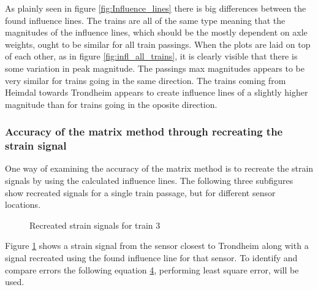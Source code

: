 As plainly seen in figure \ref{fig:Influence_lines} there is big differences between the found influence lines. The trains are all of the same type meaning that the magnitudes of the influence lines, which should be the mostly dependent on axle weights, ought to be similar for all train passings.  When the plots are laid on top of each other, as in figure \ref{fig:infl_all_trains}, it is clearly visible that there is some variation in peak magnitude. The passings max magnitudes appears to be very similar for trains going in the same direction. The trains coming from Heimdal towards Trondheim appears to create influence lines of a slightly higher magnitude than for trains going in the oposite direction.
\subsubsection{Accuracy of the matrix method through recreating the strain signal}
One way of examining the accuracy of the matrix method is to recreate the strain signals by using the calculated influence lines. The following three subfigures show recreated signals for a single train passage, but for different sensor locations.
\begin{figure}[H]
\begin{subfigure}[t]{0.9\textwidth}
\centering

\label{recreated_sensor_trond_train3}
\end{subfigure}

\begin{subfigure}[t]{0.9\textwidth}
\centering

\label{recreated_sensor_middle_train3}
\end{subfigure}

\begin{subfigure}[t]{0.9\textwidth}
\centering

\label{recreated_sensor_heimdal_train3}
\end{subfigure}

\caption{Recreated strain signals for train 3}
\label{fig:recreated_strains}
\end{figure}
Figure \ref{recreated_sensor_trond_train3} shows a strain signal from the sensor closest to Trondheim along with a signal recreated using the found influence line for that sensor. To identify and compare errors the following equation \ref{fig:recreated_strains}, performing least square error, will be used.
